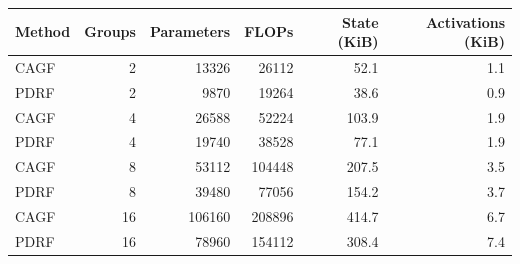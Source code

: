 \begin{tabular}{lrrrrr}
\toprule
Method & Groups & Parameters & FLOPs & State (KiB) & Activations (KiB) \\
\midrule
CAGF & 2 & 13326 & 26112 & 52.1 & 1.1 \\
PDRF & 2 & 9870 & 19264 & 38.6 & 0.9 \\
CAGF & 4 & 26588 & 52224 & 103.9 & 1.9 \\
PDRF & 4 & 19740 & 38528 & 77.1 & 1.9 \\
CAGF & 8 & 53112 & 104448 & 207.5 & 3.5 \\
PDRF & 8 & 39480 & 77056 & 154.2 & 3.7 \\
CAGF & 16 & 106160 & 208896 & 414.7 & 6.7 \\
PDRF & 16 & 78960 & 154112 & 308.4 & 7.4 \\
\bottomrule
\end{tabular}